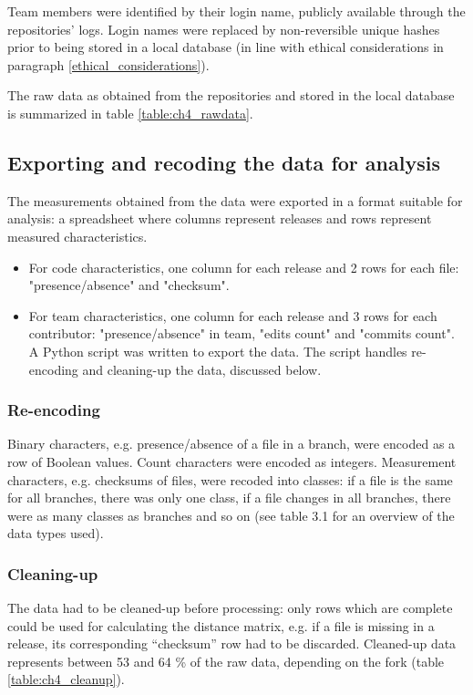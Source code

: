 Team members were identified by their login name, publicly available through the repositories’ logs. Login names were replaced by non-reversible unique hashes prior to being stored in a local database (in line with ethical considerations in paragraph \ref{ethical_considerations}).

The raw data as obtained from the repositories and stored in the local database is summarized in table \ref{table:ch4_rawdata}.



\subsection{Exporting and recoding the data for analysis}
\label{exporting_recoding}

The measurements obtained from the data were exported in a format suitable for analysis: a spreadsheet where columns represent releases and rows represent measured characteristics.

\begin{itemize}
\item{For code characteristics, one column for each release and 2 rows for each file: "presence/absence" and "checksum".}
\item{For team characteristics, one column for each release and 3 rows for each contributor: "presence/absence" in team, "edits count" and "commits count".
A Python script was written to export the data. The script handles re-encoding and cleaning-up the data, discussed below.}
\end{itemize}

\subsubsection{Re-encoding}
Binary characters, e.g. presence/absence of a file in a branch, were encoded as a row of Boolean values. Count characters were encoded as integers. Measurement characters, e.g. checksums of files, were recoded into classes: if a file is the same for all branches, there was only one class, if a file changes in all branches, there were as many classes as branches and so on (see table 3.1 for an overview of the data types used).

\subsubsection{Cleaning-up}
The data had to be cleaned-up before processing: only rows which are complete could be used for calculating the distance matrix, e.g. if a file is missing in a release, its corresponding “checksum” row had to be discarded. Cleaned-up data represents between 53 and 64 \% of the raw data, depending on the fork (table \ref{table:ch4_cleanup}).

